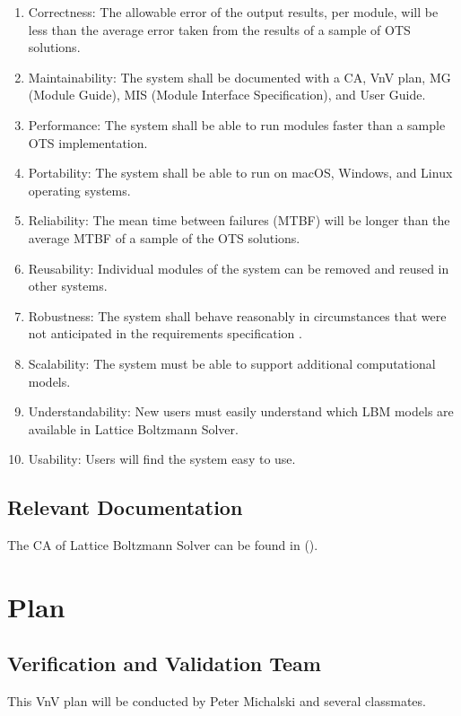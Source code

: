 \documentclass[12pt, titlepage]{article}
\newcommand{\famname}{Lattice Boltzmann Solver}
\begin{document}
\begin{enumerate}
\item Correctness: The allowable error of the output results, per module, will
  be less than the average error taken from the results of a sample of OTS
  solutions.
\item Maintainability: The system shall be documented with a CA, VnV plan, MG
  (Module Guide), MIS (Module Interface Specification), and User Guide.
\item Performance: The system shall be able to run modules faster than a sample
  OTS implementation.
\item Portability: The system shall be able to run on macOS, Windows, and Linux
  operating systems.
\item Reliability: The mean time between failures (MTBF) will be longer than the
  average MTBF of a sample of the OTS solutions.
\item Reusability: Individual modules of the system can be removed and reused in
  other systems.
\item Robustness: The system shall behave reasonably in circumstances that were
  not anticipated in the requirements specification
  \cite{ghezzi1991fundamentals}.
\item Scalability: The system must be able to support additional computational
  models.
\item Understandability: New users must easily understand which LBM models are
  available in {\famname}.
\item Usability: Users will find the system easy to use.
\end{enumerate}

\subsection{Relevant Documentation}

The CA of {\famname} can be found in (\citet{LBM_CA_PM}).

\newpage

\section{Plan}
\label{testplan}	
\subsection{Verification and Validation Team}

This VnV plan will be conducted by Peter Michalski and several classmates.
\end{document}

